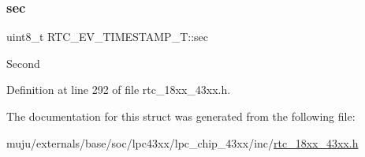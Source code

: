 \subsubsection{\texorpdfstring{sec}{sec}}
{\footnotesize\ttfamily uint8\+\_\+t R\+T\+C\+\_\+\+E\+V\+\_\+\+T\+I\+M\+E\+S\+T\+A\+M\+P\+\_\+\+T\+::sec}

Second 

Definition at line 292 of file rtc\+\_\+18xx\+\_\+43xx.\+h.



The documentation for this struct was generated from the following file\+:\begin{DoxyCompactItemize}
\item 
muju/externals/base/soc/lpc43xx/lpc\+\_\+chip\+\_\+43xx/inc/\hyperlink{rtc__18xx__43xx_8h}{rtc\+\_\+18xx\+\_\+43xx.\+h}\end{DoxyCompactItemize}
